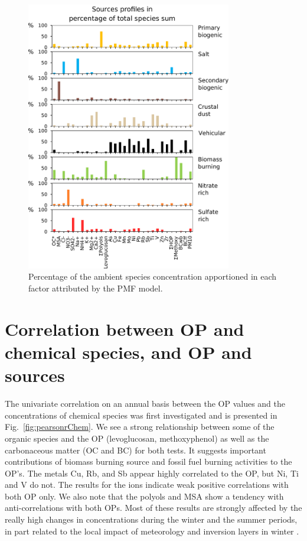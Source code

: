 \documentclass[]{article}
\begin{document}
\begin{figure}[h]
    \centering
    \includegraphics[width=0.8\textwidth]{figures/SI_fig01}
    \caption{Percentage of the ambient species concentration apportioned in each
        factor attributed by the PMF model.}
    \label{fig:concPercent}
\end{figure}
\clearpage

\section{Correlation between OP and chemical species, and OP and
sources}\label{si-2-correlation-between-op-and-chemical-species-and-op-and-sources}

The univariate correlation on an annual basis between the OP values and the
concentrations of chemical species was first investigated and is presented in
Fig.~\ref{fig:pearsonrChem}. We see a strong relationship between some of the
organic species and the OP (levoglucosan, methoxyphenol) as well as the
carbonaceous matter (OC and BC) for both tests. It suggests important
contributions of biomass burning source and fossil fuel burning activities to
the OP's. The metals Cu, Rb, and Sb appear highly correlated to the OP, but Ni,
Ti and V do not. The results for the ions indicate weak positive correlations
with both OP only. We also note that the polyols and MSA show a tendency with
anti-correlations with both OPs. Most of these results are strongly affected by
the really high changes in concentrations during the winter and the summer
periods, in part related to the local impact of meteorology and inversion layers
in winter \citep{calas_comparison_2018}.
\end{document}
